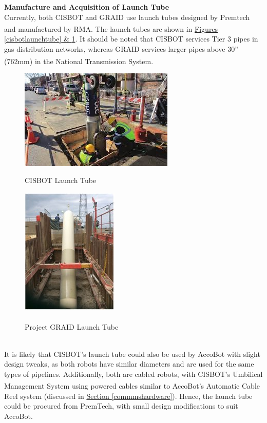 \documentclass[11pt]{article}		%
\newlength{\imageheight}	 %
\newcommand{\supercite}[1]{\textsuperscript{\cite{#1}}}		%
\newcommand{\sectref}[1]{\hyperref[#1]{Section \ref*{#1}}}     %
\begin{document}
            \textbf{Manufacture and Acquisition of Launch Tube}
            \\
            Currently, both CISBOT and GRAID use launch tubes designed by Premtech and manufactured by RMA\supercite{launchtubemfg}. The launch tubes are shown in \hyperref[cisbotlaunchtube]{Figures \ref*{cisbotlaunchtube} \& \ref*{graidlaunchtube}}. It should be noted that CISBOT services Tier 3 pipes in gas distribution networks, whereas GRAID services larger pipes above 30” (762mm) in the National Transmission System\supercite{GRAID}.
		\begin{figure}[h]
				\centering
				\begin{multicols}{2}
				    \includegraphics[height = 0.8\imageheight]{CISBOTlaunchtube.jpg}
    				\caption{CISBOT Launch Tube \cite{CISBOT_project}}
    				\label{cisbotlaunchtube}
    				\columnbreak
    				\includegraphics[height = 0.8\imageheight]{GRAIDlaunchtube.jpg}
    				\caption{Project GRAID Launch Tube\supercite{GRAID}}
    				\label{graidlaunchtube}
				\end{multicols}
			\end{figure}
			\\
            \hspace*{2ex}It is likely that CISBOT’s launch tube could also be used by AccoBot with slight design tweaks, as both robots have similar diameters and are used for the same types of pipelines. Additionally, both are cabled robots, with CISBOT’s Umbilical Management System using powered cables\supercite{CISBOTUMS} similar to AccoBot's Automatic Cable Reel system (discussed in \sectref{commmshardware}). Hence, the launch tube could be procured from PremTech, with small design modifications to suit AccoBot.
            
\end{document}
